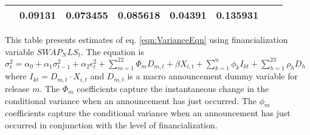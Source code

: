 \begin{sidewaystable}
{\begin{tabular}{@{}lllllllllllll@{}}
                          & \multicolumn{2}{c}{ 0.09131 }                                                 & \multicolumn{2}{c}{ 0.073455 }                                                 & \multicolumn{2}{c}{ 0.085618 }                                                 & \multicolumn{2}{c}{ 0.04391 }                                                   & \multicolumn{2}{c}{ 0.135931 }                                                 \\ \bottomrule 
\end{tabular}
}
\begin{tablenotes}\item 
        \singlespacing
        \footnotesize
        This table presents estimates of eq. \ref{eqn:VarianceEqn} using financialization variable $SWAP_NLS_t$. The equation is $\sigma_{t}^2=\alpha_0+\alpha_1 \sigma_{t-1}^2+\alpha_2 \epsilon_t^2 +\sum_{m=1}^{22} \Phi_m D_{m,t}+\beta X_{i,t}+\sum_{k=1}^n \phi_k I_{kt} + \sum_{h=1}^{23} \rho_h D_h$ where $I_{kt}=D_{m,t} \cdot X_{i,t}$ and $D_{m,t}$ is a macro announcement dummy variable for release $m$. The $\Phi_m$ coefficients capture the instantaneous change in the conditional variance when an announcement has just occurred. The $\phi_m$ coefficients capture the conditional variance when an announcement has just occurred in conjunction with the level of financialization.
\end{tablenotes}
\end{sidewaystable}

